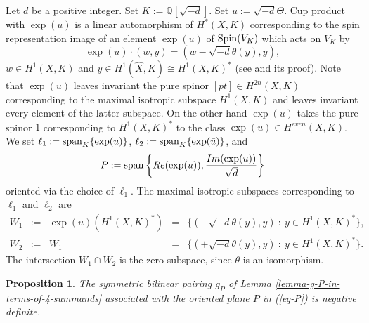 \documentclass[12pt]{amsart}
\numberwithin{equation}{subsection}
\theoremstyle{plain}
\newtheorem{prop}[thm]{Proposition}
\theoremstyle{definition}
\newcommand{\QQ}{{\mathbb Q}}
\newcommand{\Spin}{{\rm Spin}}
\renewcommand{\span}{{\rm span}}
\begin{document}
Let $d$ be a positive integer. Set $K:=\QQ[\sqrt{-d}]$. 
Set $u:=\sqrt{-d}\Theta$. Cup product with $\exp(u)$ is a linear automorphism
of $H^*(X,K)$ corresponding to the spin representation image of an element $\exp(u)$ of $\Spin(V_K)$ which acts on $V_K$ by
\begin{equation}
\label{eq-action-of-exp-u-on-V}
\exp(u)\cdot (w,y)=(w-\sqrt{-d}\theta(y),y),
\end{equation}
$w\in H^1(X,K)$ and $y\in H^1(\hat{X},K)\cong H^1(X,K)^*$ (see \cite[III.1.7]{chevalley} and its proof).
Note that $\exp(u)$ leaves invariant the pure spinor $[pt]\in H^{2n}(X,K)$ corresponding to the maximal isotropic subspace
$H^1(X,K)$ and leaves invariant every element of the latter subspace. On the other hand $\exp(u)$ takes the pure spinor $1$ corresponding to $H^1(X,K)^*$ to the class 
$\exp(u)\in H^{even}(X,K)$. We set $\ell_1:=\span_K\{\exp(u)\}$, $\ell_2:=\span_K\{\exp(\bar{u})\}$, and 
\begin{equation}
\label{eq-P}
P:=\span\left\{Re(\exp(u)),\frac{Im(\exp(u))}{\sqrt{d}}\right\}
\end{equation} 
oriented via the choice of $\ell_1$.
The maximal isotropic subspaces  corresponding to $\ell_1$ and $\ell_2$ are 
\begin{equation}
\label{eq-W-1-and-2}
\begin{array}{lcccc}
W_1&:=&\exp(u)(H^1(X,K)^*)&=&
\{(-\sqrt{-d}\theta(y),y) \ : \
y\in H^1(X,K)^*
\},
\\
W_2&:=&\overline{W_1}&=&
\{(+\sqrt{-d}\theta(y),y) \ : \
y\in H^1(X,K)^*
\}.
\end{array}
\end{equation}
The intersection $W_1\cap W_2$ is the zero subspace, since $\theta$ is an isomorphism.

\begin{prop}
\label{prop-polarized-abelian-variety-of-Weil-type}
The symmetric bilinear pairing $g_P$ of Lemma \ref{lemma-g-P-in-terms-of-4-summands} associated with the oriented plane $P$ in (\ref{eq-P}) is negative definite.
\end{prop}
\end{document}
